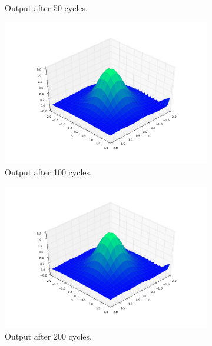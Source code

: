 \documentclass[a4paper,10pt]{article}
\numberwithin{equation}{section} %
\numberwithin{figure}{section} %
\numberwithin{table}{section} %
\theoremstyle{mytheor}
\begin{document}
\begin{enumerate}
\begin{figure}[h!]
\begin{subfigure}[b]{0.45\textwidth}
				\caption{Output after 50 cycles.}
			\end{subfigure}
			\begin{subfigure}[b]{0.45\textwidth}
				\includegraphics[width=\textwidth]{ex2_3_100.png}\vspace{-0.5cm}
				\caption{Output after 100 cycles.}
			\end{subfigure}
			\begin{subfigure}[b]{0.45\textwidth}
				\includegraphics[width=\textwidth]{ex2_3_200.png}\vspace{-0.5cm}
				\caption{Output after 200 cycles.}
			\end{subfigure}
			\begin{subfigure}[b]{0.45\textwidth}

\end{subfigure}
\end{figure}
\end{enumerate}
\end{document}
